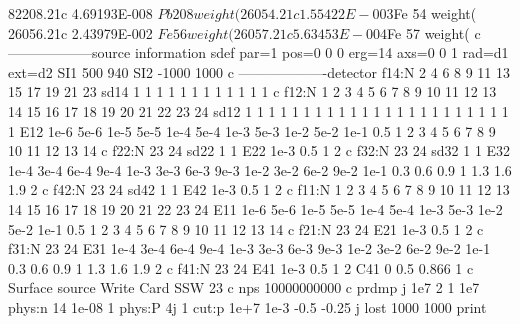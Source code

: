 \begin{python}
82208.21c 4.69193E-008 $Pb208 weight(%
26054.21c 1.55422E-003 $Fe 54 weight(%
26056.21c 2.43979E-002 $Fe 56 weight(%
26057.21c 5.63453E-004 $Fe 57 weight(%
c ------------------source information
sdef par=1 pos=0 0 0 erg=14 axs=0 0 1 rad=d1 ext=d2
SI1 500 940           
SI2 -1000 1000                 
c -------------------detector
f14:N 2 4 6 8 9 11 13 15 17 19 21 23
sd14 1 1 1 1 1 1 1 1 1 1 1 1
c
f12:N 1 2 3 4 5 6 7 8 9 10 11 12 13 14 15 16 17 18 19 20 21 22 23 24
sd12 1 1 1 1 1 1 1 1 1 1 1 1 1 1 1 1 1 1 1 1 1 1 1 1
E12 1e-6 5e-6 1e-5 5e-5 1e-4 5e-4 1e-3 5e-3 1e-2 5e-2 1e-1 0.5 
1 2 3 4 5 6 7 8 9 10 11 12 13 14
c 
f22:N 23 24
sd22 1 1
E22 1e-3 0.5 1 2
c 
f32:N 23 24
sd32 1 1 
E32 1e-4 3e-4 6e-4 9e-4 1e-3 3e-3 6e-3 9e-3 1e-2 3e-2 6e-2 9e-2 1e-1 
0.3 0.6 0.9 1 1.3 1.6 1.9 2
c 
f42:N 23 24
sd42 1 1
E42 1e-3 0.5 1 2
c
f11:N 1 2 3 4 5 6 7 8 9 10 11 12 13 14 15 16 17 18 19 20 21 22 23 24
E11 1e-6 5e-6 1e-5 5e-5 1e-4 5e-4 1e-3 5e-3 1e-2 5e-2 1e-1 0.5 
1 2 3 4 5 6 7 8 9 10 11 12 13 14
c 
f21:N 23 24
E21 1e-3 0.5 1 2
c 
f31:N 23 24
E31 1e-4 3e-4 6e-4 9e-4 1e-3 3e-3 6e-3 9e-3 1e-2 3e-2 6e-2 9e-2 1e-1 
0.3 0.6 0.9 1 1.3 1.6 1.9 2
c 
f41:N 23 24
E41 1e-3 0.5 1 2
C41 0 0.5 0.866 1
c Surface source Write Card
SSW 23
c
nps 10000000000                                            
c                                                                               
prdmp   j 1e7  2 1 1e7                                          
phys:n  14 1e-08  1                            
phys:P  4j 1                                                                      
cut:p   1e+7  1e-3  -0.5  -0.25  j                                      
lost    1000 1000
print                     
\end{python}
